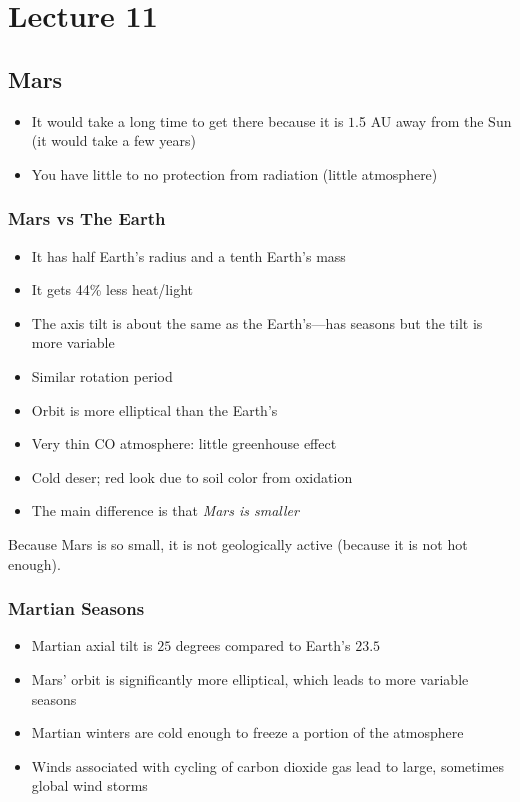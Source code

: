 \documentclass[class=article, crop=false]{standalone}
\begin{document}
  \section{Lecture 11}
  \subsection{Mars}
  \begin{itemize}
    \item It would take a long time to get there because it is $1$.5 AU away from the Sun (it would take a few years)
    \item You have little to no protection from radiation (little atmosphere)
  \end{itemize}
  \subsubsection{Mars vs The Earth}
  \begin{itemize}
    \item It has half Earth's radius and a tenth Earth's mass
    \item It gets 44\% less heat/light
    \item The axis tilt is about the same as the Earth's---has seasons but the tilt is more variable
    \item Similar rotation period
    \item Orbit is more elliptical than the Earth's
    \item Very thin CO atmosphere: little greenhouse effect
    \item Cold deser; red look due to soil color from oxidation
    \item The main difference is that \emph{Mars is smaller}
  \end{itemize}
  \begin{note}{}
    Because Mars is so small, it is not geologically active (because it is not hot enough).
  \end{note}
  \subsubsection{Martian Seasons}
  \begin{itemize}
    \item Martian axial tilt is $25$ degrees compared to Earth's $23.5$
    \item Mars' orbit is significantly more elliptical, which leads to more variable seasons
    \item Martian winters are cold enough to freeze a portion of the atmosphere
    \item Winds associated with cycling of carbon dioxide gas lead to large, sometimes global wind storms
  \end{itemize}
\end{document}
